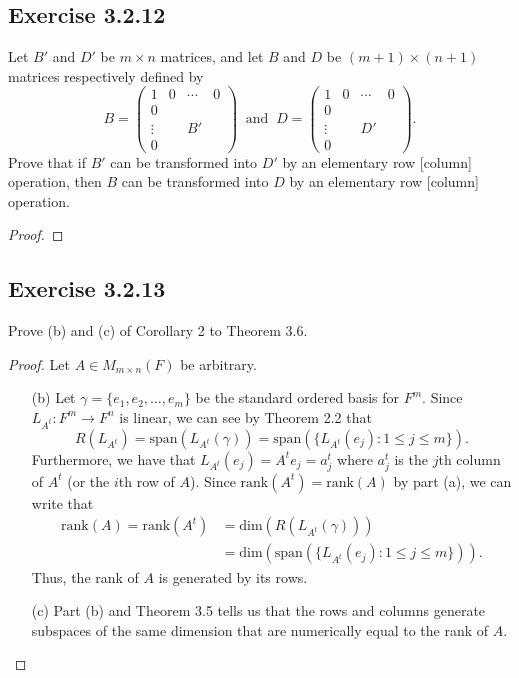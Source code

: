 \subsection*{Exercise 3.2.12} Let \( B'  \) and \( D'  \) be \( m \times n  \) matrices, and let \( B  \) and \( D  \) be \( (m + 1) \times (n+1) \) matrices respectively defined by 
\[  B = \begin{pmatrix} 
        1 & 0 & \cdots & 0  \\
        0  &  \\
        \vdots & & B' &   \\
        0 &    &
    \end{pmatrix} \ \text{ and } \ D = \begin{pmatrix} 
        1 & 0 & \cdots & 0  \\
        0  &  \\
        \vdots & & D' &   \\
        0 &    &
              \end{pmatrix}.   \]
              Prove that if \( B'  \) can be transformed into \( D'  \) by an elementary row [column] operation, then \( B  \) can be transformed into \( D  \) by an elementary row [column] operation.
              \begin{proof}

              \end{proof}


\subsection*{Exercise 3.2.13} Prove (b) and (c) of Corollary 2 to Theorem 3.6.
\begin{proof}
    Let \( A \in {M}_{m \times n}(F) \) be arbitrary.
    \begin{enumerate}
        \item[(b)] Let \( \gamma = \{ {e}_{1}, {e}_{2}, \dots, {e}_{m} \}  \) be the standard ordered basis for \( F^{m} \). Since \( {L}_{A^{t}}: F^{m} \to F^{n} \) is linear, we can see by Theorem 2.2 that
            \[ R({L}_{A^{t}}) = \text{span}({L}_{A^{t}}(\gamma)) = \text{span}( \{ {L}_{A^{t}}({e}_{j}): 1 \leq j \leq m  \} ).   \]
            Furthermore, we have that \( {L}_{A^{t}}({e}_{j}) = A^{t} {e}_{j} = a^{t}_{j} \) where \( a^{t}_j \) is the \( j \)th column of \( A^{t} \) (or the \( i \)th row of \( A \)). Since \( \text{rank}(A^{t}) = \text{rank}(A)  \) by part (a), we can write that
            \begin{align*}
                \text{rank}(A) = \text{rank}(A^{t}) &= \text{dim}(R({L}_{A^{t}}(\gamma))) \\
                                                    &= \text{dim}(\text{span}(\{ {L}_{A^{t}}({e}_{j}) : 1 \leq j \leq m  \} )).
            \end{align*}
            Thus, the rank of \( A  \) is generated by its rows.
        \item[(c)] Part (b) and Theorem 3.5 tells us that the rows and columns generate subspaces of the same dimension that are numerically equal to the rank of \( A  \).
    \end{enumerate}
\end{proof}

